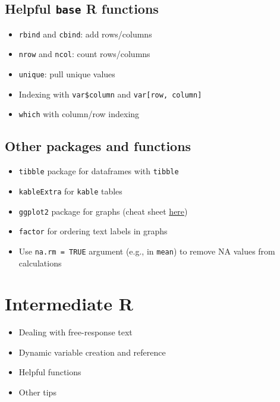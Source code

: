 \documentclass[
  openany]{book}
\providecommand{\tightlist}{%
  \setlength{\itemsep}{0pt}\setlength{\parskip}{0pt}}
\begin{document}
\hypertarget{helpful-base-r-functions}{%
\subsection{\texorpdfstring{Helpful \texttt{base} R functions}{Helpful base R functions}}\label{helpful-base-r-functions}}

\begin{itemize}
\tightlist
\item
  \texttt{rbind} and \texttt{cbind}: add rows/columns
\item
  \texttt{nrow} and \texttt{ncol}: count rows/columns
\item
  \texttt{unique}: pull unique values
\item
  Indexing with \texttt{var\$column} and \texttt{var{[}row,\ column{]}}
\item
  \texttt{which} with column/row indexing
\end{itemize}

\hypertarget{other-packages-and-functions}{%
\subsection{Other packages and functions}\label{other-packages-and-functions}}

\begin{itemize}
\tightlist
\item
  \texttt{tibble} package for dataframes with \texttt{tibble}
\item
  \texttt{kableExtra} for \texttt{kable} tables
\item
  \texttt{ggplot2} package for graphs (cheat sheet \href{https://github.com/rstudio/cheatsheets/blob/master/data-visualization-2.1.pdf}{here})
\item
  \texttt{factor} for ordering text labels in graphs
\item
  Use \texttt{na.rm\ =\ TRUE} argument (e.g., in \texttt{mean}) to remove NA values from calculations
\end{itemize}

\hypertarget{intermediate-r}{%
\section{Intermediate R}\label{intermediate-r}}

\begin{itemize}
\tightlist
\item
  Dealing with free-response text
\item
  Dynamic variable creation and reference
\item
  Helpful functions
\item
  Other tips
\end{itemize}
\end{document}
